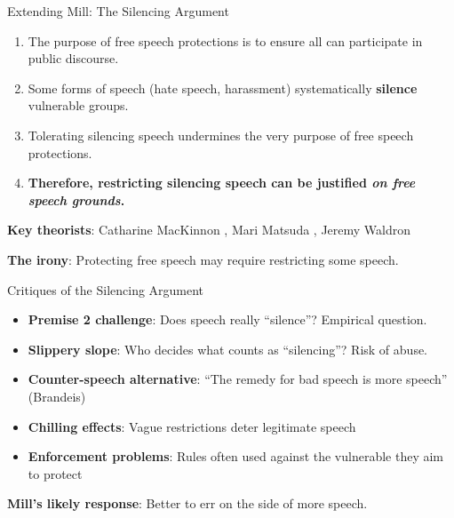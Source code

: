 ﻿\documentclass[aspectratio=169,11pt]{beamer}
\begin{document}
\begin{frame}{Extending Mill: The Silencing Argument}
\begin{argumentbox}
\begin{enumerate}
    \item The purpose of free speech protections is to ensure all can participate in public discourse.
    \item Some forms of speech (hate speech, harassment) systematically \textbf{silence} vulnerable groups.
    \item Tolerating silencing speech undermines the very purpose of free speech protections.
    \item[\textbf{C.}] \textbf{Therefore, restricting silencing speech can be justified \textit{on free speech grounds}.}
\end{enumerate}
\end{argumentbox}

\vspace{0.3cm}
\textbf{Key theorists}: Catharine MacKinnon \parencite{mackinnon1993only}, Mari Matsuda \parencite{matsuda_words_wound}, Jeremy Waldron \parencite{waldron2012harm}

\vspace{0.2cm}
\textbf{The irony}: Protecting free speech may require restricting some speech.
\end{frame}

\begin{frame}{Critiques of the Silencing Argument}
\begin{itemize}
    \item \textbf{Premise 2 challenge}: Does speech really ``silence''? Empirical question.
    
    \item \textbf{Slippery slope}: Who decides what counts as ``silencing''? Risk of abuse.
    
    \item \textbf{Counter-speech alternative}: ``The remedy for bad speech is more speech'' (Brandeis)
    
    \item \textbf{Chilling effects}: Vague restrictions deter legitimate speech
    
    \item \textbf{Enforcement problems}: Rules often used against the vulnerable they aim to protect
\end{itemize}

\vspace{0.3cm}
\textbf{Mill's likely response}: Better to err on the side of more speech.
\end{frame}
\end{document}
